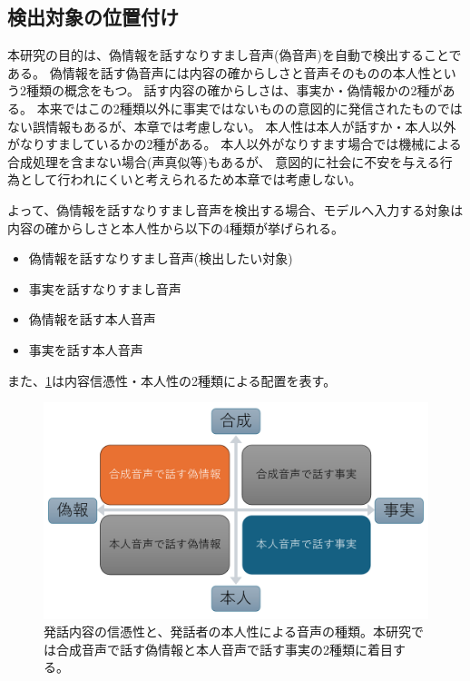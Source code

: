 \subsection{検出対象の位置付け}
本研究の目的は、偽情報を話すなりすまし音声(偽音声)を自動で検出することである。
偽情報を話す偽音声には内容の確からしさと音声そのものの本人性という2種類の概念をもつ。
話す内容の確からしさは、事実か・偽情報かの2種がある。
本来ではこの2種類以外に事実ではないものの意図的に発信されたものではない誤情報もあるが、本章では考慮しない。
本人性は本人が話すか・本人以外がなりすましているかの2種がある。
本人以外がなりすます場合では機械による合成処理を含まない場合(声真似等)もあるが、
意図的に社会に不安を与える行為として行われにくいと考えられるため本章では考慮しない。

よって、偽情報を話すなりすまし音声を検出する場合、モデルへ入力する対象は内容の確からしさと本人性から以下の4種類が挙げられる。

\begin{itemize}
    \item 偽情報を話すなりすまし音声(検出したい対象)
    \item 事実を話すなりすまし音声
    \item 偽情報を話す本人音声
    \item 事実を話す本人音声
\end{itemize}

また、\cref{fig:twoPerspective}は内容信憑性・本人性の2種類による配置を表す。

\begin{figure}[p]
    \centering
    \includegraphics[width=\linewidth]{figures/D論概念図.pdf}
    \caption{発話内容の信憑性と、発話者の本人性による音声の種類。本研究では合成音声で話す偽情報と本人音声で話す事実の2種類に着目する。}
    \label{fig:twoPerspective}
\end{figure}

